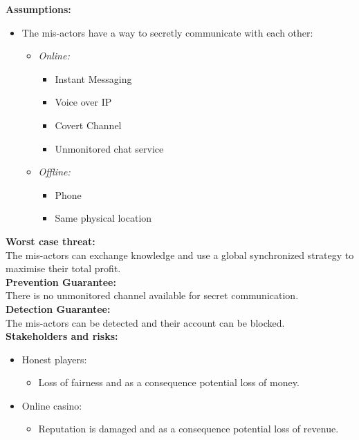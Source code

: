 \documentclass[a4paper,11pt]{report}
\begin{document}
\textbf{Assumptions:}
\begin{itemize}
\item The mis-actors have a way to secretly communicate with each other:
\begin{itemize}
\item \emph{Online:}
\begin{itemize}
\item Instant Messaging
\item Voice over IP
\item Covert Channel
\item Unmonitored chat service
\end{itemize}
\item \emph{Offline:}
\begin{itemize}
\item Phone
\item Same physical location
\end{itemize}
\end{itemize}
\end{itemize}
\textbf{Worst case threat:}\\
The mis-actors can exchange knowledge and use a global synchronized strategy to maximise their total profit. \\
\textbf{Prevention Guarantee:} \\
There is no unmonitored channel available for secret communication. \\
\textbf{Detection Guarantee:} \\
The mis-actors can be detected and their account can be blocked. \\
\textbf{Stakeholders and risks:}
\begin{itemize}
\item Honest players: 
\begin{itemize}
\item Loss of fairness and as a consequence potential loss of money.
\end{itemize}
\item Online casino: 
\begin{itemize}
\item Reputation is damaged and as a consequence potential loss of revenue.
\end{itemize}
\end{itemize}
\end{document}
